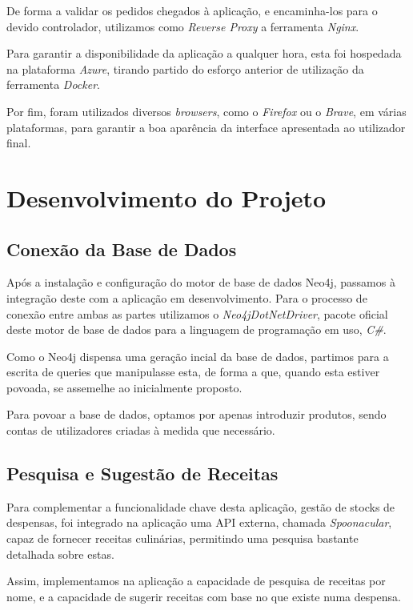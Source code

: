 \documentclass[a4paper]{report}
\begin{document}
De forma a validar os pedidos chegados à aplicação, e encaminha-los para o
devido controlador, utilizamos como \textit{Reverse Proxy} a ferramenta
\textit{Nginx}.

Para garantir a disponibilidade da aplicação a qualquer hora, esta foi hospedada
na plataforma \textit{Azure}, tirando partido do esforço anterior de utilização
da ferramenta \textit{Docker}.

Por fim, foram utilizados diversos \textit{browsers}, como o \textit{Firefox} ou
o \textit{Brave}, em várias plataformas, para garantir a boa aparência da
interface apresentada ao utilizador final.

\chapter{Desenvolvimento do Projeto}
    \section{Conexão da Base de Dados}
    Após a instalação e configuração do motor de base de dados Neo4j, passamos à
    integração deste com a aplicação em desenvolvimento. Para o processo de
    conexão entre ambas as partes utilizamos o \textit{Neo4jDotNetDriver},
    pacote oficial deste motor de base de dados para a linguagem de programação
    em uso, \textit{C\#}.

    Como o Neo4j dispensa uma geração incial da base de dados, partimos para a
    escrita de queries que manipulasse esta, de forma a que, quando esta estiver
    povoada, se assemelhe ao inicialmente proposto.

    Para povoar a base de dados, optamos por apenas introduzir produtos, sendo
    contas de utilizadores criadas à medida que necessário.

    \section{Pesquisa e Sugestão de Receitas}
    Para complementar a funcionalidade chave desta aplicação, gestão de stocks
    de despensas, foi integrado na aplicação uma API externa, chamada
    \textit{Spoonacular}, capaz de fornecer receitas culinárias, permitindo uma
    pesquisa bastante detalhada sobre estas.

    Assim, implementamos na aplicação a capacidade de pesquisa de receitas por
    nome, e a capacidade de sugerir receitas com base no que existe numa
    despensa.
\end{document}
